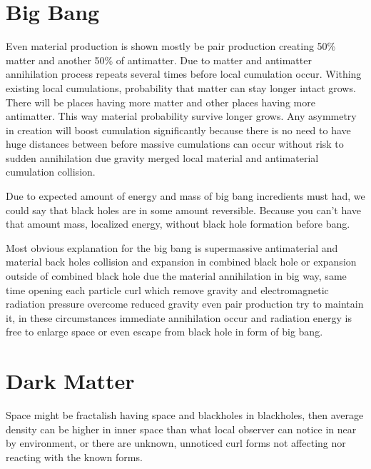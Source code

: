 \section{Big Bang}
\label{big_bang}

Even material production is shown mostly be pair production creating 50\%
matter and another 50\% of antimatter. Due to matter and antimatter
annihilation process repeats several times before local cumulation occur.
Withing existing local cumulations, probability that matter can stay longer
intact grows. There will be places having more matter and other places having
more antimatter. This way material probability survive longer grows. Any
asymmetry in creation will boost cumulation significantly because there is no
need to have huge distances between before massive cumulations can occur
without risk to sudden annihilation due gravity merged local material and
antimaterial cumulation collision.

Due to expected amount of energy and mass of big bang incredients must had,
we could say that black holes are in some amount reversible. Because you can't
have that amount mass, localized energy, without black hole formation before
bang.

Most obvious explanation for the big bang is supermassive antimaterial and
material back holes collision and expansion in combined black hole or
expansion outside of combined black hole due the material annihilation in big
way, same time opening each particle curl which remove gravity and
electromagnetic radiation pressure overcome reduced gravity even pair
production try to maintain it, in these circumstances immediate annihilation
occur and radiation energy is free to enlarge space or even escape from black
hole in form of big bang.


\section{Dark Matter}
\label{dark_matter}

Space might be fractalish having space and blackholes in blackholes, then
average density can be higher in inner space than what local observer can
notice in near by environment, or there are unknown, unnoticed curl forms
not affecting nor reacting with the known forms.

\begin{comment}\end{comment}
